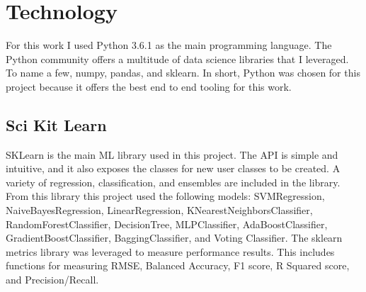 \section{Technology}
\setlength{\parindent}{10ex}
For this work I used Python 3.6.1 as the main programming language.
The Python community offers a multitude of data science libraries that I leveraged.
To name a few, numpy, pandas, and sklearn.
In short, Python was chosen for this project because it offers the best end to end tooling for this work.

\subsection{Sci Kit Learn}
SKLearn is the main \ac{ML} library used in this project.
The \ac{API} is simple and intuitive, and it also exposes the classes for new user classes to be created.
A variety of regression, classification, and ensembles are included in the library.
From this library this project used the following models: SVMRegression, NaiveBayesRegression, LinearRegression, KNearestNeighborsClassifier, RandomForestClassifier, DecisionTree, MLPClassifier, AdaBoostClassifier, GradientBoostClassifier, BaggingClassifier, and Voting Classifier.
The sklearn metrics library was leveraged to measure performance results.
This includes functions for measuring \ac{RMSE}, Balanced Accuracy, F1 score, R Squared score, and Precision/Recall.
